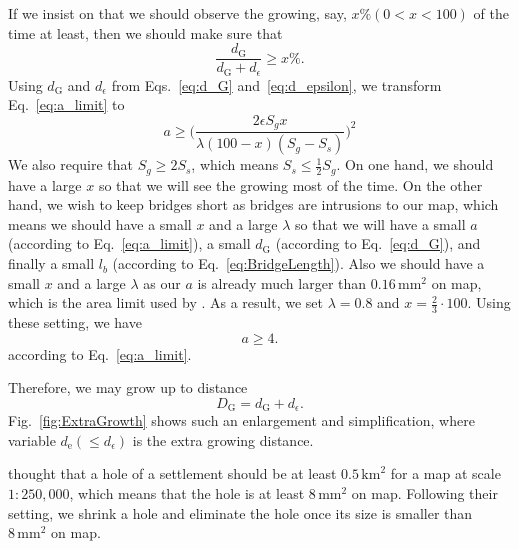 \documentclass[graybox]{svmult}
\begin{document}
If we insist on that we should observe 
the growing, say, $x \% (0<x<100)$ of the time at least, then we should make 
sure that
\begin{equation}
\label{eq:a_limit}
\frac{d_\mathrm{G}}{d_\mathrm{G}+d_\epsilon} \ge x \%.
\end{equation}
Using $d_\mathrm{G}$ and $d_\epsilon$ from Eqs.~\ref{eq:d_G} 
and~\ref{eq:d_epsilon}, we transform Eq.~\ref{eq:a_limit} to
\begin{equation}
a \ge \Big(\frac{2 \epsilon S_g x}{\lambda (100-x) (S_g-S_s)}\Big)^2
\end{equation}
We also require 
that $S_g \ge 2 S_s$, which means $S_s \le \frac{1}{2} S_g$.
On one hand, we should have a large $x$ so that we will see the 
growing most of the time.
On the other hand, we wish to keep bridges short as bridges are intrusions to 
our map, which means we should have a small $x$ and a large $\lambda$ so that 
we will have a small 
$a$ (according to Eq.~\ref{eq:a_limit}), a small $d_\mathrm{G}$ (according to 
Eq.~\ref{eq:d_G}), and finally a small $l_b$ (according to 
Eq.~\ref{eq:BridgeLength}). Also we should have a small $x$ and a large 
$\lambda$ as our $a$ is already much larger than $0.16\,\mathrm{mm}^2$ on 
map, which is the area limit used by \textcite{Stoter2009}. As a result, we 
set 
$\lambda=0.8$ and $x=\frac{2}{3} \cdot 100$.
Using these setting, we have
\begin{equation}
a \ge 4.
\end{equation}
according to Eq.~\ref{eq:a_limit}.




Therefore, we may grow up to distance 
\[
D_\mathrm{G} = d_\mathrm{G} + d_\epsilon.
\]
Fig.~\ref{fig:ExtraGrowth} shows such an enlargement and simplification, 
where  
variable $d_\mathrm{e} (\le d_\epsilon)$ is the extra growing distance.


\textcite{Chaudhry2008} thought that a hole of a settlement should be at least 
$0.5\,\mathrm{km}^2$ for a map at scale $1:250{,}000$, 
which means that the hole is at least $8\,\mathrm{mm}^2$ on map. 
Following their setting, we shrink a hole and 
eliminate the hole once its size is smaller than $8\,\mathrm{mm}^2$ on map.
\end{document}
